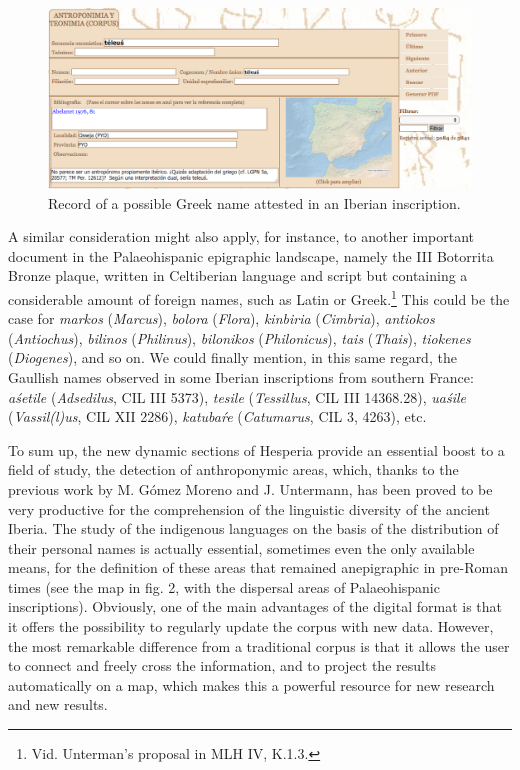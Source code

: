 \documentclass[amsthm,ebook]{saparticle}
\begin{document}
\begin{figure}[!hbp]
\centering
 \includegraphics[width=\columnwidth]{EpigraphyandonomasticsinHesperiadatabanktemplate-img010.png}
\caption{Record of a possible Greek name attested in an Iberian inscription.}
\label{fig:10}
\end{figure}
 



A similar consideration might also apply, for instance, to another important document in the Palaeohispanic epigraphic
landscape, namely the III Botorrita Bronze plaque, written in Celtiberian language and script but containing a
considerable amount of foreign names, such as Latin or Greek.\footnote{ Vid. Unterman’s proposal in MLH IV, K.1.3. }
This could be the case for \emph{markos} (\emph{Marcus}), \emph{bolora} (\emph{Flora}), \emph{kinbiria} (\emph{Cimbria}), \emph{antiokos} (\emph{Antiochus}), \emph{bilinos}
(\emph{Philinus}), \emph{bilonikos} (\emph{Philonicus}), \emph{tais} (\emph{Thais}), \emph{tiokenes} (\emph{Diogenes}), and so on. We could finally mention, in this
same regard, the Gaullish names observed in some Iberian inscriptions from southern France: \emph{aśetile} (\emph{Adsedilus}, CIL III
5373), \emph{tesile} (\emph{Tessillus}, CIL III 14368.28), \emph{uaśile} (\emph{Vassil(l)us}, CIL XII 2286), \emph{katubaŕe} (\emph{Catumarus}, CIL 3, 4263),
etc.

To sum up, the new dynamic sections of Hesperia provide an essential boost to a field of study, the detection of
anthroponymic areas, which, thanks to the previous work by M. Gómez Moreno and J. Untermann, has been proved to be very
productive for the comprehension of the linguistic diversity of the ancient Iberia. The study of the indigenous
languages on the basis of the distribution of their personal names is actually essential, sometimes even the only
available means, for the definition of these areas that remained anepigraphic in pre-Roman times (see the map in fig.
2, with the dispersal areas of Palaeohispanic inscriptions). Obviously, one of the main advantages of the digital
format is that it offers the possibility to regularly update the corpus with new data. However, the most remarkable
difference from a traditional corpus is that it allows the user to connect and freely cross the information, and to
project the results automatically on a map, which makes this a powerful resource for new research and new results.
\end{document}
